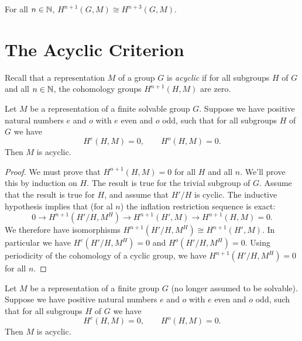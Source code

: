 \begin{corollary}
	For all $n \in {\mathbb N}$, $H^{n+1}(G,M) \cong H^{n+3}(G,M)$.
\end{corollary}







\section{The Acyclic Criterion}

Recall that a representation $M$ of a group $G$ is \emph{acyclic} if for all subgroups $H$ of $G$
and all $n \in {\mathbb N}$, the cohomology groups $H^{n+1}(H,M)$ are zero.

\begin{theorem}
	Let $M$ be a representation of a finite solvable group $G$.
	Suppose we have positive natural numbers $e$ and $o$ with $e$ even and $o$ odd, such that for all subgroups $H$ of $G$ we have
	\[
		H^e(H,M) = 0, \qquad H^o(H,M) = 0.
	\]
	Then $M$ is acyclic.
\end{theorem}

\begin{proof}
	We must prove that $H^{n+1}(H,M) = 0$ for all $H$ and all $n$.
	We'll prove this by induction on $H$. The result is true for the trivial subgroup of $G$.
	Assume that the result is true for $H$, and assume that $H' / H$ is cyclic.
	The inductive hypothesis implies that (for al $n$) the inflation restriction sequence is exact:
	\[
		0 \to H^{n + 1} (H'/H, M^H) \to H^{n+1}(H' , M) \to H^{n+1}(H,M)= 0.
	\]
	We therefore have isomorphisms $H^{n + 1} (H'/H, M^H) \cong H^{n+1}(H' , M)$.
	In particular we have $H^{e} (H'/H, M^H) = 0$ and $H^{o} (H'/H, M^H) = 0$.
	Using periodicity of the cohomology of a cyclic group, we have $H^{n+1}(H'/H,M^H)=0$ for all $n$.
\end{proof}


\begin{theorem}
	Let $M$ be a representation of a finite group $G$ (no longer assumed to be solvable).
	Suppose we have positive natural numbers $e$ and $o$ with $e$ even and $o$ odd, such that for all subgroups $H$ of $G$ we have
	\[
		H^e(H,M) =0, \qquad H^o(H,M) = 0.
	\]
	Then $M$ is acyclic.
\end{theorem}

